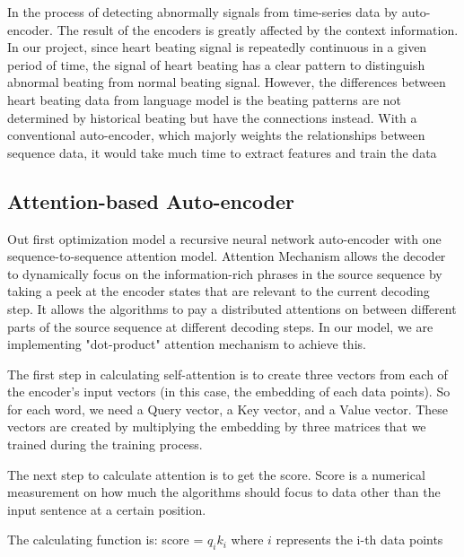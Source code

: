 \documentclass{article}
\begin{document}
In the process of detecting abnormally signals from time-series data by auto-encoder. The result of the encoders is greatly affected by the context information. In our project, since heart beating signal is repeatedly continuous in a given period of time, the signal of heart beating has a clear pattern to distinguish abnormal beating from normal beating signal. However, the differences between heart beating data from language model is the beating patterns are not determined by historical beating but have the connections instead. With a conventional auto-encoder, which majorly weights the relationships between sequence data, it would take much time to extract features and train the data

\subsection{Attention-based Auto-encoder}
Out first optimization model a recursive neural network auto-encoder with one sequence-to-sequence attention model. Attention Mechanism allows the decoder to dynamically focus on the information-rich phrases in the source sequence by taking a peek at the encoder states that are relevant to the current decoding step. It allows the algorithms to pay a distributed attentions on between different parts of the source sequence at different decoding steps. In our model, we are implementing "dot-product" attention mechanism to achieve this. 

The first step in calculating self-attention is to create three vectors from each of the encoder’s input vectors (in this case, the embedding of each data points). So for each word, we need a Query vector, a Key vector, and a Value vector. These vectors are created by multiplying the embedding by three matrices that we trained during the training process.

The next step to calculate attention is to get the score. Score is a numerical measurement on how much the algorithms should focus to data other than the input sentence at a certain position. 

The calculating function is: score = $q_{i}$\cdot$k_{i}$ where $i$ represents the i-th data points
\end{document}

